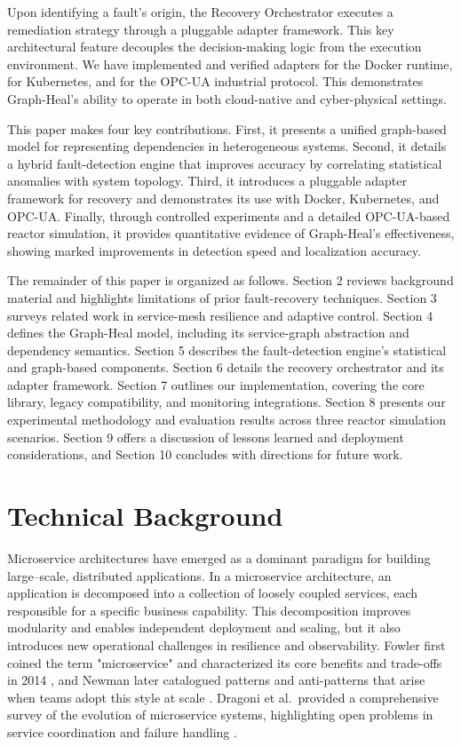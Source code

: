\documentclass[11pt,conference]{IEEEtran}
\begin{document}
Upon identifying a fault's origin, the Recovery Orchestrator executes a remediation strategy through a pluggable adapter framework. This key architectural feature decouples the decision-making logic from the execution environment. We have implemented and verified adapters for the Docker runtime, for Kubernetes, and for the OPC-UA industrial protocol. This demonstrates Graph-Heal's ability to operate in both cloud-native and cyber-physical settings.

This paper makes four key contributions. First, it presents a unified graph-based model for representing dependencies in heterogeneous systems. Second, it details a hybrid fault-detection engine that improves accuracy by correlating statistical anomalies with system topology. Third, it introduces a pluggable adapter framework for recovery and demonstrates its use with Docker, Kubernetes, and OPC-UA. Finally, through controlled experiments and a detailed OPC-UA-based reactor simulation, it provides quantitative evidence of Graph-Heal's effectiveness, showing marked improvements in detection speed and localization accuracy.

The remainder of this paper is organized as follows. Section 2 reviews background material and highlights limitations of prior fault-recovery techniques. Section 3 surveys related work in service-mesh resilience and adaptive control. Section 4 defines the Graph-Heal model, including its service-graph abstraction and dependency semantics. Section 5 describes the fault-detection engine's statistical and graph-based components. Section 6 details the recovery orchestrator and its adapter framework. Section 7 outlines our implementation, covering the core library, legacy compatibility, and monitoring integrations. Section 8 presents our experimental methodology and evaluation results across three reactor simulation scenarios. Section 9 offers a discussion of lessons learned and deployment considerations, and Section 10 concludes with directions for future work.

\section{Technical Background}

Microservice architectures have emerged as a dominant paradigm for building large–scale, distributed applications.  In a microservice architecture, an application is decomposed into a collection of loosely coupled services, each responsible for a specific business capability.  This decomposition improves modularity and enables independent deployment and scaling, but it also introduces new operational challenges in resilience and observability.  Fowler first coined the term "microservice" and characterized its core benefits and trade-offs in 2014 \cite{Fowler2014}, and Newman later catalogued patterns and anti-patterns that arise when teams adopt this style at scale \cite{Newman2015}.  Dragoni et al.\ provided a comprehensive survey of the evolution of microservice systems, highlighting open problems in service coordination and failure handling \cite{Dragoni2017}.
\end{document}

